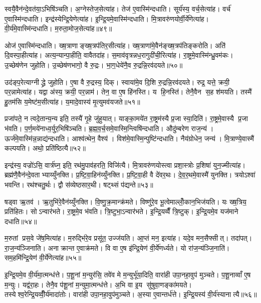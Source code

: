 स्वयै॒वैन॑न्दे॒वत॑या॒ऽभिषि॑ञ्चति। अ॒ग्नेस्तेज॒सेत्या॑ह। तेज॑ ए॒वास्मि॑न्दधाति। सूर्य॑स्य॒ वर्च॒सेत्या॑ह। वर्च॑ ए॒वास्मि॑न्दधाति। इन्द्र॑स्येन्द्रि॒येणेत्या॑ह। इ॒न्द्रि॒यमे॒वास्मि॑न्दधाति। मि॒त्रावरु॑णयोर्वी॒र्ये॑णेत्या॑ह। वी॒र्य॑मे॒वास्मि॑न्दधाति। म॒रुता॒मोज॒सेत्या॑ह॥४९॥

ओज॑ ए॒वास्मि॑न्दधाति। ख्ष॒त्राणाङ्ख्ष॒त्रप॑तिर॒सीत्या॑ह। ख्ष॒त्राणा॑मे॒वैन॑ङ्ख्ष॒त्रप॑तिङ्करोति। अति॑ दि॒वस्पा॒हीत्या॑ह। अत्य॒न्यान्पा॒हीति॒ वावैतदा॑ह। स॒माव॑वृत्रन्नध॒रागुदी॑ची॒रित्या॑ह। रा॒ष्ट्रमे॒वास्मि॑न्ध्रु॒वम॑कः। उ॒च्छेष॑णेन जुहोति। उ॒च्छेष॑णभागो॒ वै रु॒द्रः। भा॒ग॒धेये॑नै॒व रु॒द्रन्नि॒रव॑दयते॥५०॥

उद॑ङ्प॒रेत्याग्नीद्ध्रे जुहोति। ए॒षा वै रु॒द्रस्य॒ दिक्। स्वाया॑मे॒व दि॒शि रु॒द्रन्नि॒रव॑दयते। रुद्र॒ यत्ते॒ क्रयी॒ पर॒न्नामेत्या॑ह। यद्वा अ॑स्य॒ क्रयी॒ पर॒न्नाम॑। तेन॒ वा ए॒ष हि॑नस्ति। य हि॒नस्ति॑। तेनै॒वैन स॒ह श॑मयति। तस्मै॑ हु॒तम॑सि य॒मेष्ट॑म॒सीत्या॑ह। य॒मादे॒वास्य॑ मृ॒त्युमव॑यजते॥५१॥

प्रजा॑पते॒ न त्वदे॒तान्य॒न्य इति॒ तस्यै॑ गृ॒हे जु॑हुयात्। याङ्का॒मये॑त रा॒ष्ट्रम॑स्यै प्र॒जा स्या॒दिति॑। रा॒ष्ट्रमे॒वास्यै प्र॒जा भ॑वति। प॒र्ण॒मये॑नाध्व॒र्युर॒भिषि॑ञ्चति। ब्र॒ह्म॒व॒र्च॒समे॒वास्मि॒न्त्विषि॑न्दधाति। औदु॑म्बरेण राज॒न्य॑। ऊर्ज॑मे॒वास्मि॑न्न॒न्नाद्य॑न्दधाति। आश्व॑त्थेन॒ वैश्य॑। विश॑मे॒वास्मि॒न्पुष्टि॑न्दधाति। नैय॑ग्रोधेन॒ जन्य॑। मि॒त्राण्ये॒वास्मै॑ कल्पयति। अथो॒ प्रति॑ष्ठित्यै॥५२॥

इन्द्र॑स्य॒ वज्रो॑ऽसि॒ वार्त्र॑घ्न॒ इति॒ रथ॑मु॒पाव॑हरति॒ विजि॑त्यै। मि॒त्रावरु॑णयोस्त्वा प्रशा॒स्त्रोः प्र॒शिषा॑ युन॒ज्मीत्या॑ह। ब्रह्म॑णै॒वैन॑न्दे॒वताभ्याय्युँनक्ति। प्र॒ष्टि॒वा॒हिन॑य्युँनक्ति। प्र॒ष्टि॒वा॒ही वै दे॑वर॒थः। दे॒व॒र॒थमे॒वास्मै॑ युनक्ति। त्रयोऽश्वा॑ भवन्ति। रथ॑श्चतु॒र्थः। द्वौ स॑व्येष्ठसार॒थी। षट्थ्सं प॑द्यन्ते॥५३॥

षड्वा ऋ॒तव॑। ऋ॒तुभि॑रे॒वैन॑य्युँनक्ति। वि॒ष्णु॒क्र॒मान्क्र॑मते। विष्णु॑रे॒व भू॒त्वेमाल्लोँ॒कान॒भिज॑यति। यः ख्ष॒त्रिय॒ प्रति॑हितः। सोऽन्वार॑भते। रा॒ष्ट्रमे॒व भ॑वति। त्रि॒ष्टुभा॒ऽन्वार॑भते। इ॒न्द्रि॒यव्वैँ त्रि॒ष्टुक्। इ॒न्द्रि॒यमे॒व यज॑माने दधाति॥५४॥

म॒रुतां प्रस॒वे जे॑ष॒मित्या॑ह। म॒रुद्भि॑रे॒व प्रसू॑त॒ उज्ज॑यति। आ॒प्तं मन॒ इत्या॑ह। यदे॒व मन॒सैफ्सीत्। तदा॑पत्। रा॒ज॒न्य॑ञ्जिनाति। अनाक्रान्त ए॒वाक्र॑मते। वि वा ए॒ष इ॑न्द्रि॒येण॑ वी॒र्ये॑णर्ध्यते। यो रा॑ज॒न्य॑ञ्जि॒नाति॑। सम॒हमि॑न्द्रि॒येण॑ वी॒र्ये॑णेत्या॑ह॥५५॥

इ॒न्द्रि॒यमे॒व वी॒र्य॑मा॒त्मन्ध॑त्ते। प॒शू॒नां म॒न्युर॑सि॒ तवे॑व मे म॒न्युर्भू॑या॒दिति॒ वारा॑ही उपा॒नहा॒वुप॑ मुञ्चते। प॒शू॒नाव्वाँ ए॒ष म॒न्युः। यद्व॑रा॒हः। तेनै॒व प॑शू॒नां म॒न्युमा॒त्मन्ध॑त्ते। अ॒भि वा इ॒य सु॑षुवा॒णङ्का॑मयते। तस्येश्व॒रेन्द्रि॒यव्वीँ॒र्य॑मादा॑तोः। वारा॑ही उपा॒नहा॒वुप॑मुञ्चते। अ॒स्या ए॒वान्तर्ध॑त्ते। इ॒न्द्रि॒यस्य॑ वी॒र्य॑स्यानात्यै॥५६॥

